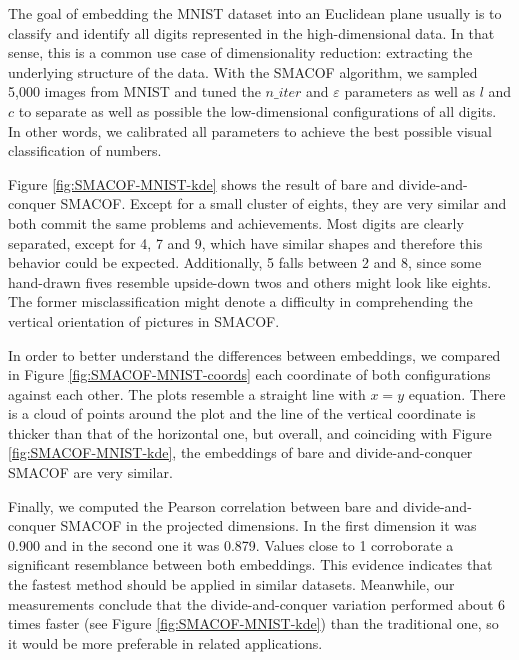 The goal of embedding the MNIST dataset into an Euclidean plane usually is to classify and identify all digits represented in the high-dimensional data. In that sense, this is a common use case of dimensionality reduction: extracting the underlying structure of the data. With the SMACOF algorithm, we sampled 5,000 images from MNIST and tuned the $n\_iter$ and $\varepsilon$ parameters as well as $l$ and $c$ to separate as well as possible the low-dimensional configurations of all digits. In other words, we calibrated all parameters to achieve the best possible visual classification of numbers.

Figure \ref{fig:SMACOF-MNIST-kde} shows the result of bare and divide-and-conquer SMACOF. Except for a small cluster of eights, they are very similar and both commit the same problems and achievements. Most digits are clearly separated, except for 4, 7 and 9, which have similar shapes and therefore this behavior could be expected. Additionally, 5 falls between 2 and 8, since some hand-drawn fives resemble upside-down twos and others might look like eights. The former misclassification might denote a difficulty in comprehending the vertical orientation of pictures in SMACOF.

In order to better understand the differences between embeddings, we compared in Figure \ref{fig:SMACOF-MNIST-coords} each coordinate of both configurations against each other. The plots resemble a straight line with $x=y$ equation. There is a cloud of points around the plot and the line of the vertical coordinate is thicker than that of the horizontal one, but overall, and coinciding with Figure \ref{fig:SMACOF-MNIST-kde}, the embeddings of bare and divide-and-conquer SMACOF are very similar.

Finally, we computed the Pearson correlation between bare and divide-and-conquer SMACOF in the projected dimensions. In the first dimension it was 0.900 and in the second one it was 0.879. Values close to 1 corroborate a significant resemblance between both embeddings. This evidence indicates that the fastest method should be applied in similar datasets. Meanwhile, our measurements conclude that the divide-and-conquer variation performed about 6 times faster (see Figure \ref{fig:SMACOF-MNIST-kde}) than the traditional one, so it would be more preferable in related applications.

